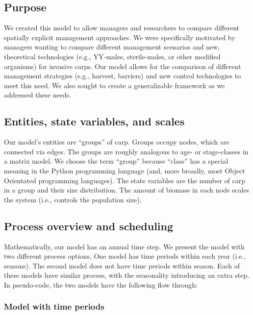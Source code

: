 \documentclass{article}[12pt]
\begin{document}
\subsection{Purpose}

We created this model to allow managers and researchers to compare different spatially explicit management approaches.
We were specifically motivated by managers wanting to compare different management scenarios and new, theoretical technologies (e.g., YY-males, sterile-males, or other modified organisms) for invasive carps. 
Our model allows for the comparison of different management strategies (e.g., harvest, barriers) and new control technologies to meet this need.
We also sought to create a generalizable framework as we addressed these needs. 

\subsection{Entities, state variables, and scales}

Our model's entities are ``groups'' of carp. 
Groups occupy nodes, which are connected via edges.
The groups are roughly analogous to age- or stage-classes in a matrix model.
We choose the term ``group'' because ``class'' has a special meaning in the Python programming language (and, more broadly, most Object Orientated programming languages). 
The state variables are the number of carp in a group and their size distribution.
The amount of biomass in each node scales the system (i.e., controls the population size). 

\subsection{Process overview and scheduling}

Mathematically, our model has an annual time step.
We present the model with two different process options.
One model has time periods within each year (i.e., seasons).
The second model does not have time periods within season. 
Each of these models have similar process, with the seasonality introducing an extra step. 
In pseudo-code, the two models have the following flow through: 

\subsubsection{Model with time periods}
\end{document}
